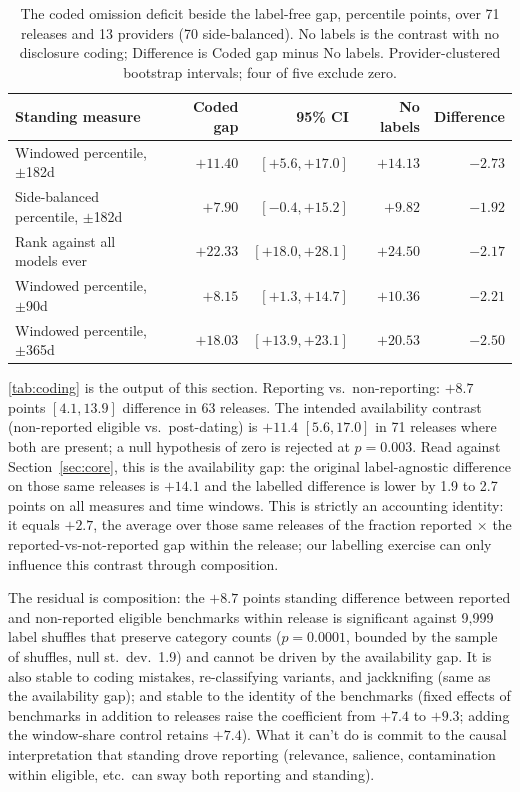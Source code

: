 \documentclass{article}
\begin{document}
\begin{table}[!htb]
\centering
\small
\setlength{\tabcolsep}{5pt}
\begin{tabular}{lrrrr}
\toprule
Standing measure & Coded gap & 95\% CI & No labels & Difference \\
\midrule
Windowed percentile, $\pm$182d & $+11.40$ & $[+5.6, +17.0]$ & $+14.13$ & $-2.73$ \\
Side-balanced percentile, $\pm$182d & $+7.90$ & $[-0.4, +15.2]$ & $+9.82$ & $-1.92$ \\
Rank against all models ever & $+22.33$ & $[+18.0, +28.1]$ & $+24.50$ & $-2.17$ \\
Windowed percentile, $\pm$90d & $+8.15$ & $[+1.3, +14.7]$ & $+10.36$ & $-2.21$ \\
Windowed percentile, $\pm$365d & $+18.03$ & $[+13.9, +23.1]$ & $+20.53$ & $-2.50$ \\
\bottomrule
\end{tabular}
\caption{%
The coded omission deficit beside the label-free gap, percentile points, over 71 releases and 13 providers (70 side-balanced). No labels is the contrast with no disclosure coding; Difference is Coded gap minus No labels. Provider-clustered bootstrap intervals; four of five exclude zero.}
\label{tab:coding}
\end{table}

\autoref{tab:coding} is the output of this section. Reporting vs.\ non-reporting: $+8.7$ points $[4.1, 13.9]$ difference in 63 releases. The intended availability contrast (non-reported eligible vs.\ post-dating) is $+11.4$ $[5.6, 17.0]$ in 71 releases where both are present; a null hypothesis of zero is rejected at $p = 0.003$. Read against Section~\ref{sec:core}, this is the availability gap: the original label-agnostic difference on those same releases is $+14.1$ and the labelled difference is lower by 1.9 to 2.7 points on all measures and time windows. This is strictly an accounting identity: it equals $+2.7$, the average over those same releases of the fraction reported $\times$ the reported-vs-not-reported gap within the release; our labelling exercise can only influence this contrast through composition.

The residual is composition: the $+8.7$ points standing difference between reported and non-reported eligible benchmarks within release is significant against 9,999 label shuffles that preserve category counts ($p = 0.0001$, bounded by the sample of shuffles, null st.\ dev.\ 1.9) and cannot be driven by the availability gap. It is also stable to coding mistakes, re-classifying variants, and jackknifing (same as the availability gap); and stable to the identity of the benchmarks (fixed effects of benchmarks in addition to releases raise the coefficient from $+7.4$ to $+9.3$; adding the window-share control retains $+7.4$). What it can't do is commit to the causal interpretation that standing drove reporting (relevance, salience, contamination within eligible, etc.\ can sway both reporting and standing).
\end{document}
